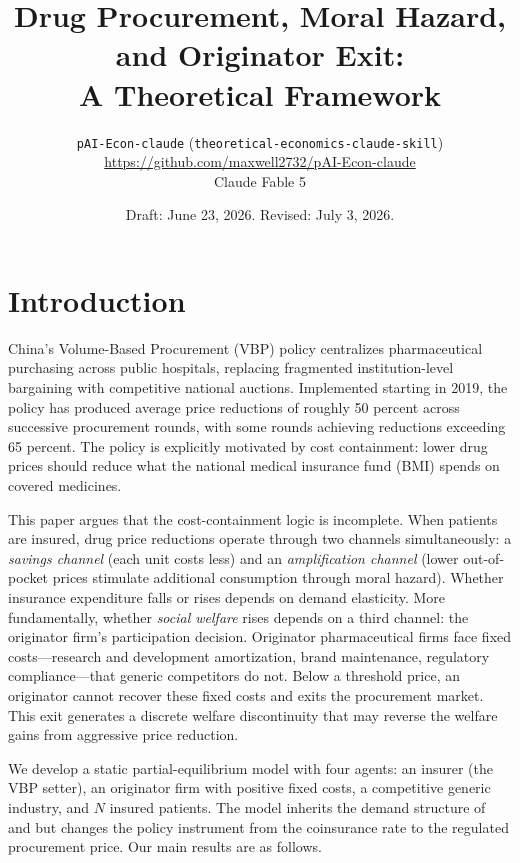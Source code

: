 \documentclass[12pt]{article}
\title{Drug Procurement, Moral Hazard, and Originator Exit:\\
A Theoretical Framework}
\author{%
  \texttt{pAI-Econ-claude} (\texttt{theoretical-economics-claude-skill})\\[4pt]
  \small\url{https://github.com/maxwell2732/pAI-Econ-claude}\\[2pt]
  \small Claude Fable 5
}
\date{Draft: June 23, 2026. Revised: July 3, 2026.}
\theoremstyle{plain}
\theoremstyle{definition}
\theoremstyle{remark}
\newcommand{\1}{\mathbf{1}}
\begin{document}
\maketitle

\section{Introduction}

China's Volume-Based Procurement (VBP) policy centralizes pharmaceutical purchasing across public hospitals, replacing fragmented institution-level bargaining with competitive national auctions. Implemented starting in 2019, the policy has produced average price reductions of roughly 50 percent across successive procurement rounds, with some rounds achieving reductions exceeding 65 percent. The policy is explicitly motivated by cost containment: lower drug prices should reduce what the national medical insurance fund (BMI) spends on covered medicines.

This paper argues that the cost-containment logic is incomplete. When patients are insured, drug price reductions operate through two channels simultaneously: a \emph{savings channel} (each unit costs less) and an \emph{amplification channel} (lower out-of-pocket prices stimulate additional consumption through moral hazard). Whether insurance expenditure falls or rises depends on demand elasticity. More fundamentally, whether \emph{social welfare} rises depends on a third channel: the originator firm's participation decision. Originator pharmaceutical firms face fixed costs---research and development amortization, brand maintenance, regulatory compliance---that generic competitors do not. Below a threshold price, an originator cannot recover these fixed costs and exits the procurement market. This exit generates a discrete welfare discontinuity that may reverse the welfare gains from aggressive price reduction.

We develop a static partial-equilibrium model with four agents: an insurer (the VBP setter), an originator firm with positive fixed costs, a competitive generic industry, and $N$ insured patients. The model inherits the demand structure of \citet{Pauly1968} and \citet{Zeckhauser1970} but changes the policy instrument from the coinsurance rate to the regulated procurement price. Our main results are as follows.
\end{document}
